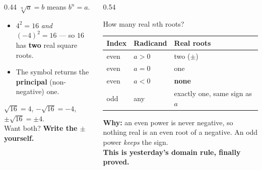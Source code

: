 \documentclass[aspectratio=169, 11pt]{beamer}
\begin{document}
\begin{frame}[t, plain]
  \begin{columns}[T]
    \begin{column}{0.44\textwidth}
      $\sqrt[n]{a}=b$ \; means \; $b^{n}=a$.
      \vspace{4pt}
      \begin{itemize}\setlength{\itemsep}{4pt}
        \item $4^{2}=16$ \emph{and} $(-4)^{2}=16$ --- so $16$ has \textbf{two} real square roots.
        \item The symbol returns the \textbf{principal} (non-negative) one.
      \end{itemize}
      \vspace{3pt}
      {\footnotesize $\sqrt{16}=4$, \; $-\sqrt{16}=-4$, \; $\pm\sqrt{16}=\pm4$. \\
      Want both? \textbf{Write the $\pm$ yourself.}}
    \end{column}
    \begin{column}{0.54\textwidth}
      \begin{block}{How many real $n$th roots?}
        \footnotesize
        \begin{tabular}{lll}
        \textbf{Index} & \textbf{Radicand} & \textbf{Real roots} \\
        \hline
        even & $a>0$ & two ($\pm$) \\
        even & $a=0$ & one \\
        even & $a<0$ & \textbf{none} \\
        odd  & any   & exactly one, same sign as $a$ \\
        \end{tabular}
      \end{block}
      \vspace{2pt}
      {\footnotesize \textbf{Why:} an even power is never negative, so nothing real is an even root of
      a negative. An odd power \emph{keeps} the sign. \\
      \textcolor{goldacc}{\textbf{This is yesterday's domain rule, finally proved.}}}
    \end{column}
  \end{columns}
\end{frame}
\end{document}
